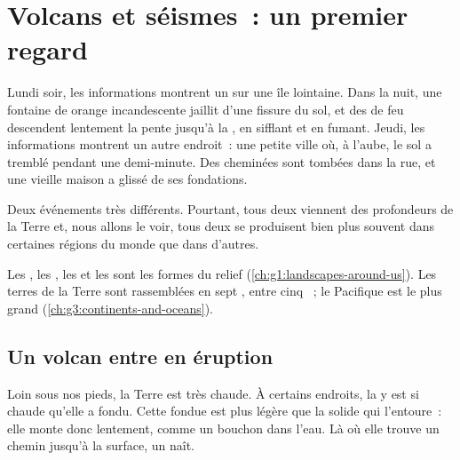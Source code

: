 \chapter{Volcans et séismes~: un premier regard}\label{ch:g4:volcanoes-earthquakes-first-look}

Lundi soir, les informations montrent un  sur une île lointaine. Dans
la nuit, une fontaine de  orange incandescente jaillit d'une fissure
du sol, et des  de feu descendent lentement la pente jusqu'à la
, en sifflant et en fumant. Jeudi, les informations montrent un autre
endroit~: une petite ville où, à l'aube, le sol a tremblé pendant une
demi-minute. Des cheminées sont tombées dans la rue, et une vieille maison
a glissé de ses fondations.

Deux événements très différents. Pourtant, tous deux viennent des
profondeurs de la Terre et, nous allons le voir, tous deux se produisent
bien plus souvent dans certaines régions du monde que dans d'autres.

\begin{recall}
Les , les , les  et les  sont les formes du
relief (\cref{ch:g1:landscapes-around-us}). Les terres de la Terre sont
rassemblées en sept , entre cinq ~; le Pacifique est le
plus grand  (\cref{ch:g3:continents-and-oceans}).
\end{recall}

\section{Un volcan entre en éruption}

Loin sous nos pieds, la Terre est très chaude. À certains endroits, la
 y est si chaude qu'elle a fondu. Cette  fondue est plus légère
que la  solide qui l'entoure~: elle monte donc lentement, comme un
bouchon dans l'eau. Là où elle trouve un chemin jusqu'à la surface, un
 naît.

